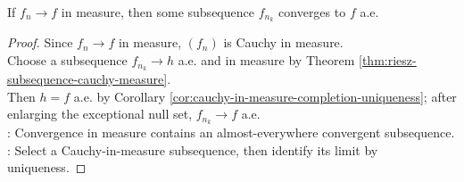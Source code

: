 \begin{corollary} \label{cor:in-measure-convergence-has-ae-subsequence} \\
If $f_n\to f$ in measure, then some subsequence $f_{n_k}$ converges to $f$ a.e.
\begin{proof} Since $f_n\to f$ in measure, $(f_n)$ is Cauchy in measure.\\
Choose a subsequence $f_{n_k}\to h$ a.e. and in measure by Theorem \ref{thm:riesz-subsequence-cauchy-measure}.\\
Then $h=f$ a.e. by Corollary \ref{cor:cauchy-in-measure-completion-uniqueness}; after enlarging the exceptional null set, $f_{n_k}\to f$ a.e.\\
: Convergence in measure contains an almost-everywhere convergent subsequence.\\
: Select a Cauchy-in-measure subsequence, then identify its limit by uniqueness.
\end{proof}
\end{corollary}

